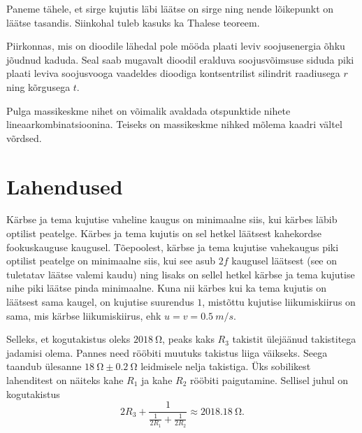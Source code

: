 \documentclass[10pt]{article}
\begin{document}

\hint
Paneme tähele, et sirge kujutis läbi läätse on sirge ning nende lõikepunkt on läätse tasandis. Siinkohal tuleb kasuks ka Thalese teoreem.
\probend
\bigskip


\hint
Piirkonnas, mis on dioodile lähedal pole mööda plaati leviv soojusenergia õhku jõudnud kaduda. Seal saab mugavalt dioodil eralduva soojusvõimsuse siduda piki plaati leviva soojusvooga vaadeldes dioodiga kontsentrilist silindrit raadiusega $r$ ning kõrgusega $t$.
\probend
\bigskip


\hint
Pulga massikeskme nihet on võimalik avaldada otspunktide nihete lineaarkombinatsioonina. Teiseks on massikeskme nihked mõlema kaadri vältel võrdsed.
\probend
\bigskip
\newpage\section{Lahendused}
        \toggleSolution
        

\solu
Kärbse ja tema kujutise vaheline kaugus on minimaalne siis, kui kärbes läbib optilist peatelge. Kärbes ja tema kujutis on sel hetkel läätsest kahekordse fookuskauguse kaugusel. Tõepoolest, kärbse ja tema kujutise vahekaugus piki optilist peatelge on minimaalne siis, kui see asub $2f$ kaugusel läätsest (see on tuletatav läätse valemi kaudu) ning lisaks on sellel hetkel kärbse ja tema kujutise nihe piki läätse pinda minimaalne. Kuna nii kärbes kui ka tema kujutis on läätsest sama kaugel, on kujutise suurendus $1$, mistõttu kujutise liikumiskiirus on sama, mis kärbse liikumiskiirus, ehk $u = v = \SI{0,5}{m/s}$.
\probend
\bigskip


\solu
Selleks, et kogutakistus oleks $\SI{2018}{\ohm}$, peaks kaks $R_3$ takistit ülejäänud takistitega jadamisi olema. Pannes need rööbiti muutuks takistus liiga väikseks. Seega taandub ülesanne $\SI{18}{\ohm}\pm\SI{0.2}{\ohm}$ leidmisele nelja takistiga. Üks sobilikest lahenditest on näiteks kahe $R_1$ ja kahe $R_2$ rööbiti paigutamine. Sellisel juhul on kogutakistus
\[
2R_3 + \frac{1}{\frac{1}{2R_1} + \frac{1}{2R_2}} \approx \SI{2018.18}{\ohm}.
\]
\probend
\bigskip
\end{document}
